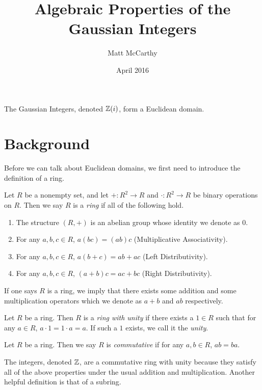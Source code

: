 \documentclass[notitlepage]{simple}
\title{Algebraic Properties of the Gaussian Integers}
\author{Matt McCarthy}
\date{April 2016}
\begin{document}
\maketitle

\begin{thm*}
	The Gaussian Integers, denoted $\mathbb{Z}(i)$, form a Euclidean domain.
\end{thm*}

\section{Background}

Before we can talk about Euclidean domains, we first need to introduce the definition of a ring.

\begin{definition}[Ring]
	Let $R$ be a nonempty set, and let $+:R^2\rightarrow R$ and $\cdot:R^2\rightarrow R$ be binary operations on $R$.
	Then we say $R$ is a \textit{ring} if all of the following hold.
	\begin{enumerate}
		\item The structure $(R,+)$ is an abelian group whose identity we denote as 0.
		\item For any $a,b,c\in R$, $a(bc)=(ab)c$ (Multiplicative Associativity).
		\item For any $a,b,c\in R$, $a(b+c)=ab+ac$ (Left Distributivity).
		\item For any $a,b,c\in R$, $(a+b)c=ac+bc$ (Right Distributivity).
	\end{enumerate}
	If one says $R$ is a ring, we imply that there exists some addition and some multiplication operators which we denote as $a+b$ and $ab$ respectively.
\end{definition}

\begin{definition}
	Let $R$ be a ring.
	Then $R$ is a \textit{ring with unity} if there exists a $1\in R$ such that for any $a\in R$, $a\cdot 1 = 1\cdot a = a$.
	If such a $1$ exists, we call it the \textit{unity}.
\end{definition}

\begin{definition}
	Let $R$ be a ring.
	Then we say $R$ is \textit{commutative} if for any $a,b\in R$, $ab=ba$.
\end{definition}

The integers, denoted $\mathbb{Z}$, are a commutative ring with unity because they satisfy all of the above properties under the usual addition and multiplication.
Another helpful definition is that of a subring.
\end{document}
